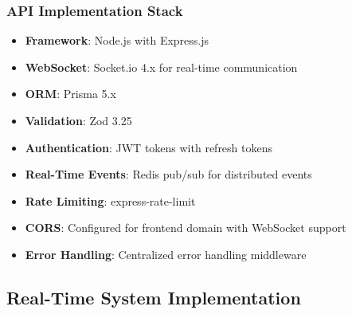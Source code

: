 \documentclass[11pt,a4paper]{article}
\begin{document}
\subsubsection{API Implementation Stack}
\begin{itemize}
    \item \textbf{Framework}: Node.js with Express.js
    \item \textbf{WebSocket}: Socket.io 4.x for real-time communication
    \item \textbf{ORM}: Prisma 5.x
    \item \textbf{Validation}: Zod 3.25
    \item \textbf{Authentication}: JWT tokens with refresh tokens
    \item \textbf{Real-Time Events}: Redis pub/sub for distributed events
    \item \textbf{Rate Limiting}: express-rate-limit
    \item \textbf{CORS}: Configured for frontend domain with WebSocket support
    \item \textbf{Error Handling}: Centralized error handling middleware
\end{itemize}

\subsection{Real-Time System Implementation}
\end{document}
